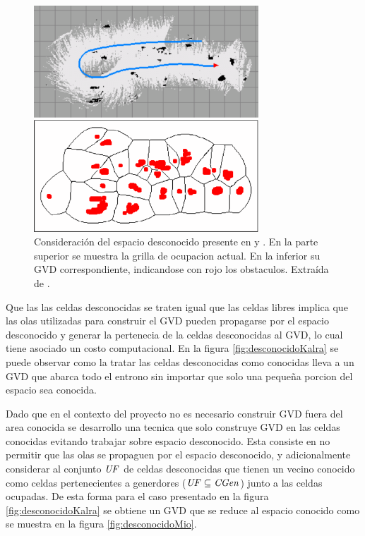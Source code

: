 \begin{figure}[H]
  \centerfloat

  \includegraphics[clip=true, width=0.75\textwidth]{imagenes/desconocidoCons/kalraOG.png}

  \caption[Consideración del espacio desconocido presente en \cite{kalra2009incremental} y \cite{Lau2013}.]{Consideración del espacio desconocido presente en \cite{kalra2009incremental} y \cite{Lau2013}. En la parte superior se muestra la grilla de ocupacion actual. En la inferior su GVD correspondiente, indicandose con rojo los obstaculos. Extraída de \cite{kalra2009incremental}.}\label{fig:kalraOG}
\end{figure}



Que las las celdas desconocidas se traten igual que las celdas libres implica
que las olas utilizadas para construir el GVD pueden propagarse por el espacio
desconocido y generar la pertenecia de la celdas desconocidas al GVD, lo cual
tiene asociado un costo computacional.
En la figura \ref{fig:desconocidoKalra} se puede observar como la tratar las
celdas desconocidas como conocidas lleva a un GVD que abarca todo el entrono
sin importar que solo una pequeña porcion del espacio sea conocida. 


Dado que en el contexto del proyecto no es necesario construir GVD fuera del
area conocida se desarrollo una tecnica que solo construye GVD en las celdas
conocidas evitando trabajar sobre espacio desconocido. Esta consiste en no
permitir que las olas se propaguen por el espacio desconocido, y
adicionalmente considerar al conjunto $\mathit{UF}$ de celdas desconocidas que tienen un
vecino conocido como celdas pertenecientes a generdores
($\mathit{UF}\subseteq \mathit{CGen}$) junto a las celdas ocupadas.
De esta forma para el caso presentado en la figura \ref{fig:desconocidoKalra}
se obtiene un GVD que se reduce al espacio conocido como se muestra en la
figura \ref{fig:desconocidoMio}.


